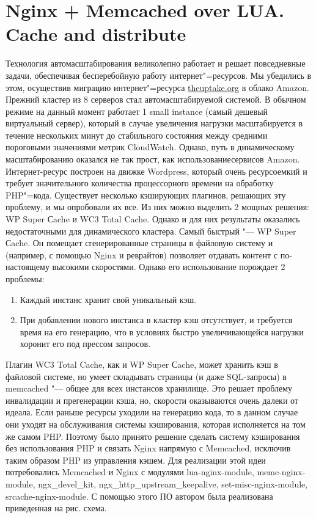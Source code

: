 \documentclass[10pt, a5paper]{article}
\begin{document}
\section*{Nginx + Memcached over LUA. Cache and distribute}

Технология автомасштабирования великолепно работает и решает повседневные задачи, обеспечивая бесперебойную работу интернет"=ресурсов. Мы убедились в этом, осуществив миграцию интернет"=ресурса \url{theuptake.org} в облако Amazon. Прежний кластер из 8 серверов стал автомасштабируемой системой. В обычном режиме на данный момент работает 1 small instance (самый дешевый виртуальный сервер), который в случае увеличения нагрузки масштабируется в течение нескольких минут до стабильного состояния между средними пороговыми значениями метрик CloudWatch. Однако, путь в динамическому масштабированию оказался не так прост, как использованиесервисов Amazon. Интернет-ресурс построен на движке Wordpress, который очень ресурсоемкий и требует значительного количества процессорного времени на обработку PHP"=кода. Существует несколько кэширующих плагинов, решающих эту проблему, и мы опробовали их все. Из них можно выделить 2 мощных решения:  WP Super Сache и WC3 Total Cache. Однако и для них результаты оказались недостаточными для динамического кластера. Самый быстрый "--- WP Super Сache. Он помещает сгенерированные страницы в файловую систему и (например, с помощью Nginx и реврайтов) позволяет отдавать контент с по-настоящему высокими скоростями. Однако его использование порождает 2 проблемы: 
\begin{enumerate}
	\item Каждый инстанс хранит свой уникальный кэш. 
	\item При добавлении нового инстанса в кластер кэш отсутствует, и требуется время на его генерацию, что в условиях быстро увеличивающейся нагрузки хоронит его под прессом запросов. 
\end{enumerate}

Плагин WC3 Total Cache, как и WP Super Сache, может хранить кэш в файловой системе, но умеет складывать страницы (и даже SQL-запросы) в memcached "--- общее для всех инстансов хранилище. Это решает проблему инвалидации и прегенерации кэша, но, скорости оказываются очень далеки от идеала. Если раньше ресурсы уходили на генерацию кода, то в данном случае они уходят на обслуживания системы кэширования, которая исполняется на том же самом PHP. Поэтому было принято решение сделать систему кэширования без использования PHP и связать Nginx напрямую с Memcached, исключив таким образом PHP из управления кэшем. Для реализации этой идеи потребовались Memcached и Nginx с модулями lua-nginx-module, memc-nginx-module, ngx\_devel\_kit,  ngx\_http\_upstream\_keepalive, set-misc-nginx-module, srcache-nginx-module. С помощью этого ПО автором была реализована приведенная на рис. схема.
\end{document}
